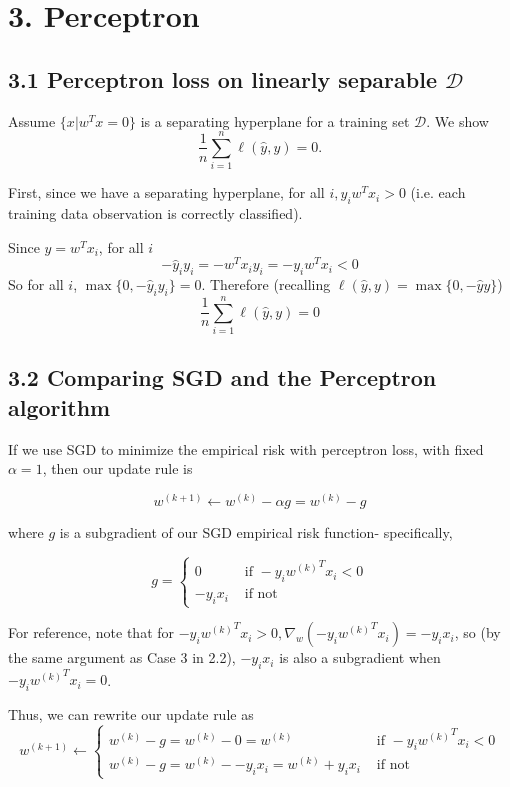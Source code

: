 \documentclass[paper=a4, fontsize=11pt]{scrartcl} %
\numberwithin{equation}{section} %
\numberwithin{figure}{section} %
\numberwithin{table}{section} %
\begin{document}

\section*{3. Perceptron}
\subsection*{3.1 Perceptron loss on linearly separable $\mathcal{D}$}

Assume $\{x | w^Tx = 0\}$ is a separating hyperplane for a training set $\mathcal{D}$. We show
\[\frac{1}{n} \sum_{i = 1}^n \ell(\hat{y}, y) = 0.\]

First, since we have a separating hyperplane, for all $i, y_i w^T x_i > 0$ (i.e. each training data observation is correctly classified).

Since $\hat{y} = w^T x_i$, for all $i$
\[-\hat{y}_i y_i = -w^T x_i y_i = -y_i w^T x_i < 0\]
So for all $i$, $\max \{0, -\hat{y}_i y_i\} = 0$. Therefore (recalling $\ell(\hat{y}, y) = \max \{0, -\hat{y} y\}$)
\[\frac{1}{n} \sum_{i = 1}^n \ell(\hat{y}, y) = 0\]

\subsection*{3.2 Comparing SGD and the Perceptron algorithm}

If we use SGD to minimize the empirical risk with perceptron loss, with fixed $\alpha = 1$, then our update rule is

\[ w^{(k + 1)} \leftarrow w^{(k)} - \alpha g = w^{(k)} - g \]

where $g$ is a subgradient of our SGD empirical risk function- specifically,

\[
g = 
\begin{cases}
   0 & \textrm{ if } - y_i {w^{(k)}}^T x_i < 0 \\
   -y_i x_i & \textrm{ if not}
\end{cases}
\]

For reference, note that for $- y_i {w^{(k)}}^T x_i > 0, \nabla_w (- y_i {w^{(k)}}^T x_i) =  -y_i x_i$, so (by the same argument as Case 3 in 2.2), $-y_i x_i$ is also a subgradient when $- y_i {w^{(k)}}^T x_i = 0$.

Thus, we can rewrite our update rule as
\[
w^{(k + 1)} \leftarrow 
\begin{cases}
   w^{(k)} - g = w^{(k)} - 0 = w^{(k)} & \textrm{ if }  - y_i {w^{(k)}}^T x_i < 0 \\
   w^{(k)} - g = w^{(k)} - -y_i x_i = w^{(k)} + y_i x_i & \textrm{ if not}
\end{cases}
\]
\end{document}
